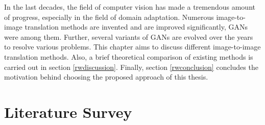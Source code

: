 
\justifying
\setlength{\parskip}{1em}

In the last decades, the field of computer vision has made a tremendous amount of progress, especially in the field of domain adaptation. Numerous image-to-image translation methods are invented and are improved significantly, \acp{GAN} were among them\cite{pang2021imagetoimage}. Further, several variants of \acp{GAN} are evolved over the years to resolve various problems. This chapter aims to discuss different image-to-image translation methods. Also, a brief theoretical comparison of existing methods is carried out in section \ref{rwdiscussion}. Finally, section \ref{rwconclusion} concludes the motivation behind choosing the proposed approach of this thesis.

\section{Literature Survey}\label{LiteratureSurvey}


